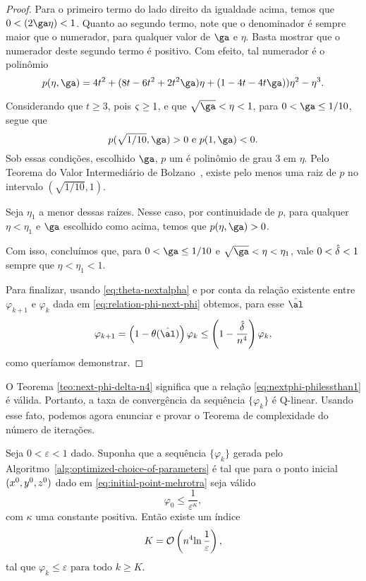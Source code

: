 \begin{proof}
	Para o primeiro termo do lado direito da igualdade acima, temos que $0 < (2\ga\eta) <1$.
	Quanto ao segundo termo, note que o denominador é  sempre maior que o numerador, para qualquer  valor de $\ga$ e $\eta$. Basta mostrar que  o numerador deste segundo termo  é positivo. Com efeito, tal numerador é o polinômio 
	\[
		p(\eta,\ga) =  4 t^2 + ( 8t - 6t^2 + 2t^2\ga) \eta + (1 - 4t - 4t   \ga) ) \eta^2 - \eta^3. 
	\]

	Considerando que $t\geq3$, pois $\varsigma\geq1$, e que $\sqrt{\ga}<\eta<1$, para $0 < \ga \leq 1/10$, segue que
	\[p(\sqrt{1/10},\ga) >0 \text{ e  } p(1,\ga) <0.\]
	Sob essas condições, escolhido $\ga$,  $p$ um é polinômio de grau 3 em $\eta$. Pelo Teorema do Valor Intermediário de Bolzano~\cite[Teorema 5.3.7]{Bartle:2011tr},  existe pelo menos uma  raiz  de $p$ no intervalo $(\sqrt{1/10},1)$. 

	Seja $\eta_{1}$ a menor dessas raízes. Nesse caso, por continuidade de $p$, para qualquer $\eta  < \eta_{1}$ e $\ga$ escolhido como acima, temos que  $p(\eta,\ga) >0$. 

	Com isso, concluímos que,  para $0 < \ga \leq 1/10$ e  $\sqrt{\ga}<\eta<\eta_{1}$, vale  $0<\hat{\delta}<1$  sempre que $\eta < \eta_{1} < 1$.

	Para finalizar, usando \eqref{eq:theta-nextalpha} e por conta da relação existente entre $\varphi_{k+1}$ e $\varphi_{k}$ dada em   \eqref{eq:relation-phi-next-phi} obtemos, para esse $\nextal$
	\[
	\varphi_{k+1}= \left(1 - \theta(\nextal)\right)\varphi_{k} \leq 
	\left(1 - \frac{\hat{\delta}}{n^{4}}\right)\varphi_{k},
	\]
como queríamos demonstrar.
	\end{proof}



O Teorema \ref{teo:next-phi-delta-n4} significa que a relação \eqref{eq:nextphi-philessthan1}
é válida. Portanto, a taxa de convergência da sequência $\{\varphi_{k}\}$ é  Q-linear. Usando esse fato, podemos agora enunciar e provar o Teorema de complexidade do número de iterações. 


\begin{teo}
	\label{teo:alg-convergence-varphi} Seja $0 < \varepsilon <1$ dado. Suponha que a sequência $\{\varphi_{k}\}$ gerada pelo Algoritmo~\ref{alg:optimized-choice-of-parameters} é  tal que 
	para o ponto inicial $(x^0,y^0,z^0)$ dado em \eqref{eq:initial-point-mehrotra} seja válido	
	\begin{equation}
	\label{eq:varphi0-eps-kappa}
		\varphi_{0}\leq \dfrac{1}{\varepsilon^{\kappa}},
	\end{equation} 
	com  $\kappa$ uma constante positiva. Então  existe um índice \[K =  \mathcal{O}\left(n^{4}{\ln\frac{1}{\varepsilon}}\right),\] tal que 
	 $\varphi_{k}\leq \varepsilon \text{ para todo } k \geq K$.
	 
\end{teo}

